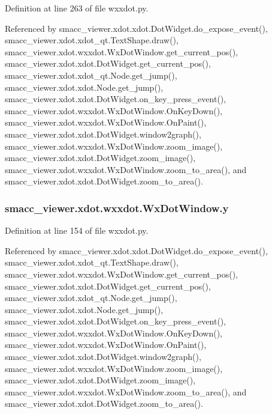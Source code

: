 Definition at line 263 of file wxxdot.\+py.



Referenced by smacc\+\_\+viewer.\+xdot.\+xdot.\+Dot\+Widget.\+do\+\_\+expose\+\_\+event(), smacc\+\_\+viewer.\+xdot.\+xdot\+\_\+qt.\+Text\+Shape.\+draw(), smacc\+\_\+viewer.\+xdot.\+wxxdot.\+Wx\+Dot\+Window.\+get\+\_\+current\+\_\+pos(), smacc\+\_\+viewer.\+xdot.\+xdot.\+Dot\+Widget.\+get\+\_\+current\+\_\+pos(), smacc\+\_\+viewer.\+xdot.\+xdot\+\_\+qt.\+Node.\+get\+\_\+jump(), smacc\+\_\+viewer.\+xdot.\+xdot.\+Node.\+get\+\_\+jump(), smacc\+\_\+viewer.\+xdot.\+xdot.\+Dot\+Widget.\+on\+\_\+key\+\_\+press\+\_\+event(), smacc\+\_\+viewer.\+xdot.\+wxxdot.\+Wx\+Dot\+Window.\+On\+Key\+Down(), smacc\+\_\+viewer.\+xdot.\+wxxdot.\+Wx\+Dot\+Window.\+On\+Paint(), smacc\+\_\+viewer.\+xdot.\+xdot.\+Dot\+Widget.\+window2graph(), smacc\+\_\+viewer.\+xdot.\+wxxdot.\+Wx\+Dot\+Window.\+zoom\+\_\+image(), smacc\+\_\+viewer.\+xdot.\+xdot.\+Dot\+Widget.\+zoom\+\_\+image(), smacc\+\_\+viewer.\+xdot.\+wxxdot.\+Wx\+Dot\+Window.\+zoom\+\_\+to\+\_\+area(), and smacc\+\_\+viewer.\+xdot.\+xdot.\+Dot\+Widget.\+zoom\+\_\+to\+\_\+area().

\subsubsection[{\texorpdfstring{y}{y}}]{\setlength{\rightskip}{0pt plus 5cm}smacc\+\_\+viewer.\+xdot.\+wxxdot.\+Wx\+Dot\+Window.\+y}\hypertarget{classsmacc__viewer_1_1xdot_1_1wxxdot_1_1WxDotWindow_add4a798dbd2255643a4dadf0e7cc417c}{}\label{classsmacc__viewer_1_1xdot_1_1wxxdot_1_1WxDotWindow_add4a798dbd2255643a4dadf0e7cc417c}


Definition at line 154 of file wxxdot.\+py.



Referenced by smacc\+\_\+viewer.\+xdot.\+xdot.\+Dot\+Widget.\+do\+\_\+expose\+\_\+event(), smacc\+\_\+viewer.\+xdot.\+xdot\+\_\+qt.\+Text\+Shape.\+draw(), smacc\+\_\+viewer.\+xdot.\+wxxdot.\+Wx\+Dot\+Window.\+get\+\_\+current\+\_\+pos(), smacc\+\_\+viewer.\+xdot.\+xdot.\+Dot\+Widget.\+get\+\_\+current\+\_\+pos(), smacc\+\_\+viewer.\+xdot.\+xdot\+\_\+qt.\+Node.\+get\+\_\+jump(), smacc\+\_\+viewer.\+xdot.\+xdot.\+Node.\+get\+\_\+jump(), smacc\+\_\+viewer.\+xdot.\+xdot.\+Dot\+Widget.\+on\+\_\+key\+\_\+press\+\_\+event(), smacc\+\_\+viewer.\+xdot.\+wxxdot.\+Wx\+Dot\+Window.\+On\+Key\+Down(), smacc\+\_\+viewer.\+xdot.\+wxxdot.\+Wx\+Dot\+Window.\+On\+Paint(), smacc\+\_\+viewer.\+xdot.\+xdot.\+Dot\+Widget.\+window2graph(), smacc\+\_\+viewer.\+xdot.\+wxxdot.\+Wx\+Dot\+Window.\+zoom\+\_\+image(), smacc\+\_\+viewer.\+xdot.\+xdot.\+Dot\+Widget.\+zoom\+\_\+image(), smacc\+\_\+viewer.\+xdot.\+wxxdot.\+Wx\+Dot\+Window.\+zoom\+\_\+to\+\_\+area(), and smacc\+\_\+viewer.\+xdot.\+xdot.\+Dot\+Widget.\+zoom\+\_\+to\+\_\+area().

